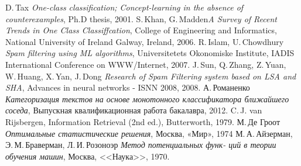 \begin{thebibliography}{99}

 D.\,Tax  \textit{One-class classification; Concept-learning in the absence of
counterexamples}, Ph.D thesis, 2001.
 S.\,Khan, G.\,Madden\textit{A Survey of Recent Trends in One Class
Classiffcation}, College of Engineering and Informatics, National University of Ireland Galway,
Ireland, 2006.
 R.\,Islam, U.\,Chowdhury \textit{Spam filtering using ML algorithms}, Universitetets Okonomiske Institute, IADIS International Conference on WWW/Internet, 2007.
 J.\,Sun, Q.\,Zhang, Z.\,Yuan, W.\,Huang, X.\,Yan, J.\,Dong \textit{Research of Spam Filtering system based on LSA and SHA}, Advances in neural networks - ISNN 2008, 2008.
 А.\,Романенко  \textit{Категоризация текстов на основе монотонного
классификатора ближайшего соседа}, Выпускная квалификационная работа бакалавра, 2012.
 C.\,J. van Rijsbergen, Information Retrieval (2nd ed.), Butterworth, 1979.
М.\,Де Гроот \textit{Оптимальные статистические решения}, Москва, «Мир», 1974
 М.\,А.\,Айзерман, Э.\,М.\,Браверман, Л.\,И.\,Розоноэр \textit{Метод потенциальных функ-
ций в теории обучения машин}, Москва, <<Наука>>, 1970.

\end{thebibliography}